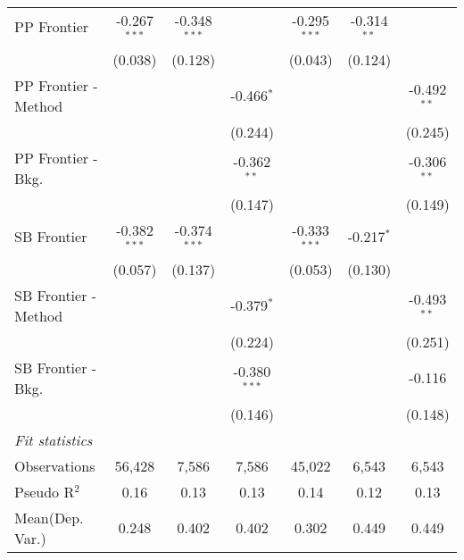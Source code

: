 \begin{tabular}{lcccccc}
   PP Frontier          & -0.267$^{***}$ & -0.348$^{***}$ &                & -0.295$^{***}$ & -0.314$^{**}$ &   \\   
                        & (0.038)        & (0.128)        &                & (0.043)        & (0.124)       &   \\   
   PP Frontier - Method &                &                & -0.466$^{*}$   &                &               & -0.492$^{**}$\\   
                        &                &                & (0.244)        &                &               & (0.245)\\   
   PP Frontier - Bkg.   &                &                & -0.362$^{**}$  &                &               & -0.306$^{**}$\\   
                        &                &                & (0.147)        &                &               & (0.149)\\   
   SB Frontier          & -0.382$^{***}$ & -0.374$^{***}$ &                & -0.333$^{***}$ & -0.217$^{*}$  &   \\   
                        & (0.057)        & (0.137)        &                & (0.053)        & (0.130)       &   \\   
   SB Frontier - Method &                &                & -0.379$^{*}$   &                &               & -0.493$^{**}$\\   
                        &                &                & (0.224)        &                &               & (0.251)\\   
   SB Frontier - Bkg.   &                &                & -0.380$^{***}$ &                &               & -0.116\\   
                        &                &                & (0.146)        &                &               & (0.148)\\   
   \midrule
   \emph{Fit statistics}\\
   Observations         & 56,428         & 7,586          & 7,586          & 45,022         & 6,543         & 6,543\\  
   Pseudo R$^2$         & 0.16           & 0.13           & 0.13           & 0.14           & 0.12          & 0.13\\  
Mean(Dep. Var.) & 0.248 & 0.402 & 0.402 & 0.302 & 0.449 & 0.449 \\
   

\end{tabular}
